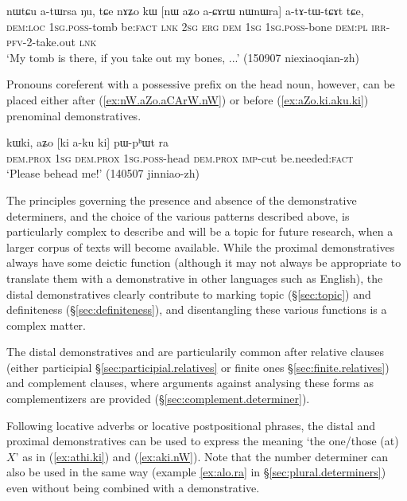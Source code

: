\begin{exe}
\ex \label{ex:nW.aZo.aCArW.nW}
 \gll nɯtɕu a-tɯrsa ŋu, tɕe nɤʑo kɯ [nɯ aʑo a-ɕɤrɯ nɯnɯra] a-tɤ-tɯ-tɕɤt tɕe, \\
 \textsc{dem}:\textsc{loc} \textsc{1sg}.\textsc{poss}-tomb be:\textsc{fact} \textsc{lnk} \textsc{2sg} \textsc{erg} \textsc{dem} \textsc{1sg} \textsc{1sg}.\textsc{poss}-bone \textsc{dem}:\textsc{pl} \textsc{irr}-\textsc{pfv}-2-take.out \textsc{lnk} \\
\glt `My tomb is there, if you take out my bones, ...' (150907 niexiaoqian-zh)
\end{exe}

Pronouns coreferent with a possessive prefix on the head noun, however, can be placed either after (\ref{ex:nW.aZo.aCArW.nW}) or before (\ref{ex:aZo.ki.aku.ki}) prenominal demonstratives.

\begin{exe}
\ex \label{ex:aZo.ki.aku.ki}
 \gll  kɯki, aʑo [ki a-ku ki] pɯ-pʰɯt ra \\
 \textsc{dem}.\textsc{prox} \textsc{1sg}  \textsc{dem}.\textsc{prox} \textsc{1sg}.\textsc{poss}-head  \textsc{dem}.\textsc{prox} \textsc{imp}-cut be.needed:\textsc{fact} \\
 \glt `Please behead me!' (140507 jinniao-zh)
\end{exe}

The principles governing the presence and absence of the demonstrative determiners, and the choice of the various patterns described above, is particularly complex to describe and will be a topic for future research, when a larger corpus of texts will become available. While the proximal demonstratives always have some deictic function (although it may not always be appropriate to translate them with a demonstrative in other languages such as English), the distal demonstratives clearly contribute to marking topic (§\ref{sec:topic}) and definiteness (§\ref{sec:definiteness}), and disentangling these various functions is a complex matter.

The distal demonstratives  and  are particularily common after relative clauses (either participial §\ref{sec:participial.relatives} or finite ones §\ref{sec:finite.relatives}) and complement clauses, where arguments against analysing these forms as complementizers are provided (§\ref{sec:complement.determiner}).

Following locative adverbs or locative postpositional phrases, the distal and proximal demonstratives can be used to express the meaning `the one/those (at) $X$' as in (\ref{ex:athi.ki}) and (\ref{ex:aki.nW}). Note that the number determiner  can also be used in the same way (example \ref{ex:alo.ra} in §\ref{sec:plural.determiners}) even without being combined with a demonstrative.

